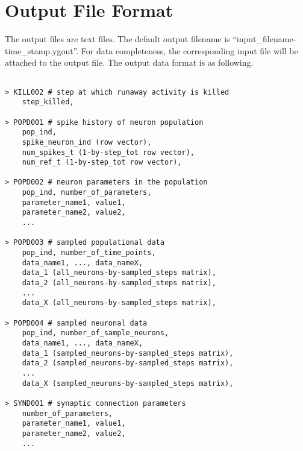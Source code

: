 \documentclass{article}
\begin{document}
\section{Output File Format}
The output files are text files.
The default output filename is ``input\_filename-time\_stamp.ygout''.
For data completeness, the corresponding input file will be attached to the output file.
The output data format is as following.
\begin{lstlisting}

> KILL002 # step at which runaway activity is killed
	step_killed,

> POPD001 # spike history of neuron population
	pop_ind,
	spike_neuron_ind (row vector),
	num_spikes_t (1-by-step_tot row vector),
	num_ref_t (1-by-step_tot row vector),

> POPD002 # neuron parameters in the population
	pop_ind, number_of_parameters,
	parameter_name1, value1,
	parameter_name2, value2,
	...

> POPD003 # sampled populational data
	pop_ind, number_of_time_points,
	data_name1, ..., data_nameX,
	data_1 (all_neurons-by-sampled_steps matrix),
	data_2 (all_neurons-by-sampled_steps matrix),
	...
	data_X (all_neurons-by-sampled_steps matrix),

> POPD004 # sampled neuronal data
	pop_ind, number_of_sample_neurons,
	data_name1, ..., data_nameX,
	data_1 (sampled_neurons-by-sampled_steps matrix),
	data_2 (sampled_neurons-by-sampled_steps matrix),
	...
	data_X (sampled_neurons-by-sampled_steps matrix),

> SYND001 # synaptic connection parameters
	number_of_parameters,
	parameter_name1, value1,
	parameter_name2, value2,
	...


\end{lstlisting}

{}

\end{document}
